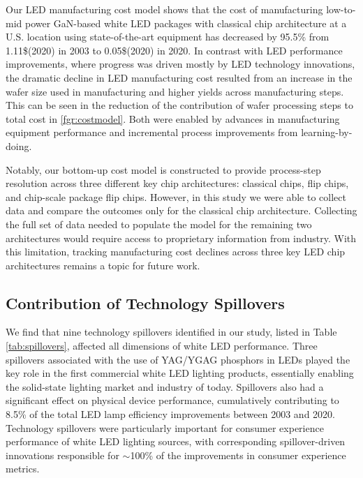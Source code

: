 \documentclass[journal=jacsat,manuscript=article]{achemso}
\begin{document}
Our LED manufacturing cost model shows that the cost of manufacturing low-to-mid power GaN-based white LED packages with classical chip architecture at a U.S. location using state-of-the-art equipment has decreased by 95.5\% from 1.11\$(2020) in 2003 to 0.05\$(2020) in 2020. In contrast with LED performance improvements, where progress was driven mostly by LED technology innovations, the dramatic decline in LED manufacturing cost resulted from an increase in the wafer size used in manufacturing and higher yields across manufacturing steps. This can be seen in the reduction of the contribution of wafer processing steps to total cost in \ref{fgr:costmodel}. Both were enabled by advances in manufacturing equipment performance and incremental process improvements from learning-by-doing.

Notably, our bottom-up cost model is constructed to provide process-step resolution across three different key chip architectures: classical chips, flip chips, and chip-scale package flip chips. However, in this study we were able to collect data and compare the outcomes only for the classical chip architecture. Collecting the full set of data needed to populate the model for the remaining two architectures would require access to proprietary information from industry. With this limitation, tracking manufacturing cost declines across three key LED chip architectures remains a topic for future work.

\subsection{Contribution of Technology Spillovers}
\label{subsec:spillovers}

We find that nine technology spillovers identified in our study, listed in Table \ref{tab:spillovers}, affected all dimensions of white LED performance. Three spillovers associated with the use of YAG/YGAG phosphors in LEDs played the key role in the first commercial white LED lighting products, essentially enabling the solid-state lighting market and industry of today. Spillovers also had a significant effect on physical device performance, cumulatively contributing to 8.5\% of the total LED lamp efficiency improvements between 2003 and 2020. Technology spillovers were particularly important for consumer experience performance of white LED lighting sources, with corresponding spillover-driven innovations responsible for $\sim$100\% of the improvements in consumer experience metrics. 
\end{document}
